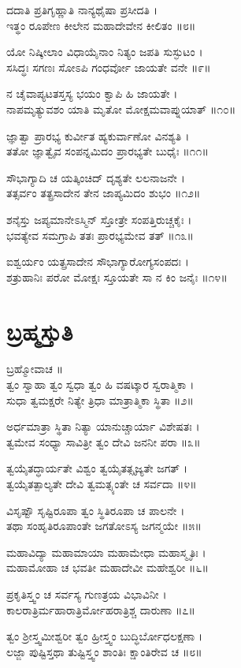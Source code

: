 ದದಾತಿ ಪ್ರತಿಗೃಹ್ಣಾತಿ ನಾನ್ಯಥೈಷಾ ಪ್ರಸೀದತಿ ।\\
ಇತ್ಥಂ ರೂಪೇಣ ಕೀಲೇನ ಮಹಾದೇವೇನ ಕೀಲಿತಂ ॥೮॥

ಯೋ ನಿಷ್ಕೀಲಾಂ ವಿಧಾಯೈನಾಂ ನಿತ್ಯಂ ಜಪತಿ ಸುಸ್ಫುಟಂ ।\\
ಸಸಿದ್ಧಃ ಸಗಣಃ ಸೋಽಪಿ ಗಂಧರ್ವೋ ಜಾಯತೇ ವನೇ ॥೯॥

ನ ಚೈವಾಪ್ಯಟತಸ್ತಸ್ಯ ಭಯಂ ಕ್ವಾಪಿ ಹಿ ಜಾಯತೇ ।\\
ನಾಪಮೃತ್ಯುವಶಂ ಯಾತಿ ಮೃತೋ ಮೋಕ್ಷಮವಾಪ್ನುಯಾತ್ ॥೧೦॥

ಜ್ಞಾತ್ವಾ ಪ್ರಾರಭ್ಯ ಕುರ್ವೀತ ಹ್ಯಕುರ್ವಾಣೋ ವಿನಶ್ಯತಿ ।\\
ತತೋ ಜ್ಞಾತ್ವೈವ ಸಂಪನ್ನಮಿದಂ ಪ್ರಾರಭ್ಯತೇ ಬುಧೈಃ ॥೧೧॥

ಸೌಭಾಗ್ಯಾದಿ ಚ ಯತ್ಕಿಂಚಿದ್ ದೃಶ್ಯತೇ ಲಲನಾಜನೇ ।\\
ತತ್ಸರ್ವಂ ತತ್ಪ್ರಸಾದೇನ ತೇನ ಜಾಪ್ಯಮಿದಂ ಶುಭಂ ॥೧೨॥

ಶನೈಸ್ತು ಜಪ್ಯಮಾನೇಽಸ್ಮಿನ್ ಸ್ತೋತ್ರೇ ಸಂಪತ್ತಿರುಚ್ಚಕೈಃ ।\\
ಭವತ್ಯೇವ ಸಮಗ್ರಾಪಿ ತತಃ ಪ್ರಾರಭ್ಯಮೇವ ತತ್ ॥೧೩॥

ಐಶ್ವರ್ಯಂ ಯತ್ಪ್ರಸಾದೇನ ಸೌಭಾಗ್ಯಾರೋಗ್ಯಸಂಪದಃ ।\\
ಶತ್ರುಹಾನಿಃ ಪರೋ ಮೋಕ್ಷಃ ಸ್ತೂಯತೇ ಸಾ ನ ಕಿಂ ಜನೈಃ ॥೧೪॥
\section{ಬ್ರಹ್ಮಸ್ತುತಿ}
ಬ್ರಹ್ಮೋವಾಚ ॥\\
ತ್ವಂ ಸ್ವಾಹಾ ತ್ವಂ ಸ್ವಧಾ ತ್ವಂ ಹಿ ವಷಟ್ಕಾರ ಸ್ವರಾತ್ಮಿಕಾ ।\\
ಸುಧಾ ತ್ವಮಕ್ಷರೇ ನಿತ್ಯೇ ತ್ರಿಧಾ ಮಾತ್ರಾತ್ಮಿಕಾ ಸ್ಥಿತಾ ॥೨॥

ಅರ್ಧಮಾತ್ರಾ ಸ್ಥಿತಾ ನಿತ್ಯಾ ಯಾನುಚ್ಚಾರ್ಯಾ ವಿಶೇಷತಃ ।\\
ತ್ವಮೇವ ಸಂಧ್ಯಾ ಸಾವಿತ್ರೀ ತ್ವಂ ದೇವಿ ಜನನೀ ಪರಾ ॥೩॥

ತ್ವಯೈತದ್ಧಾರ್ಯತೇ ವಿಶ್ವಂ ತ್ವಯೈತತ್ಸೃಜ್ಯತೇ ಜಗತ್ ।\\
ತ್ವಯೈತತ್ಪಾಲ್ಯತೇ ದೇವಿ ತ್ವಮತ್ಸ್ಯಂತೇ ಚ ಸರ್ವದಾ ॥೪॥

ವಿಸೃಷ್ಟೌ ಸೃಷ್ಟಿರೂಪಾ ತ್ವಂ ಸ್ಥಿತಿರೂಪಾ ಚ ಪಾಲನೇ ।\\
ತಥಾ ಸಂಹೃತಿರೂಪಾಂತೇ ಜಗತೋಽಸ್ಯ ಜಗನ್ಮಯೇ ॥೫॥

ಮಹಾವಿದ್ಯಾ ಮಹಾಮಾಯಾ ಮಹಾಮೇಧಾ ಮಹಾಸ್ಮೃತಿಃ ।\\
ಮಹಾಮೋಹಾ ಚ ಭವತೀ ಮಹಾದೇವೀ ಮಹೇಶ್ವರೀ ॥೬॥

ಪ್ರಕೃತಿಸ್ತ್ವಂ ಚ ಸರ್ವಸ್ಯ ಗುಣತ್ರಯ ವಿಭಾವಿನೀ ।\\
ಕಾಲರಾತ್ರಿರ್ಮಹಾರಾತ್ರಿರ್ಮೋಹರಾತ್ರಿಶ್ಚ ದಾರುಣಾ ॥೭॥

ತ್ವಂ ಶ್ರೀಸ್ತ್ವಮೀಶ್ವರೀ ತ್ವಂ ಹ್ರೀಸ್ತ್ವಂ ಬುದ್ಧಿರ್ಬೋಧಲಕ್ಷಣಾ ।\\
ಲಜ್ಜಾ ಪುಷ್ಟಿಸ್ತಥಾ ತುಷ್ಟಿಸ್ತ್ವಂ ಶಾಂತಿಃ ಕ್ಷಾಂತಿರೇವ ಚ ॥೮॥

